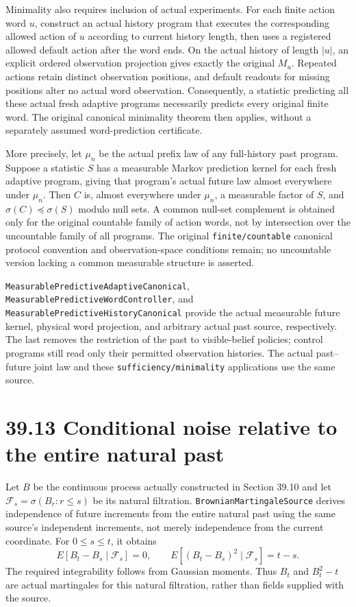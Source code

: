\documentclass[
  english,
  11pt,
  oneside]{book}
\begin{document}
Minimality also requires inclusion of actual experiments. For each finite action word \(u\), construct an actual history program that executes the corresponding allowed action of \(u\) according to current history length, then uses a registered allowed default action after the word ends. On the actual history of length \(|u|\), an explicit ordered observation projection gives exactly the original \(M_u\). Repeated actions retain distinct observation positions, and default readouts for missing positions alter no actual word observation. Consequently, a statistic predicting all these actual fresh adaptive programs necessarily predicts every original finite word. The original canonical minimality theorem then applies, without a separately assumed word-prediction certificate.

More precisely, let \(\mu_n\) be the actual prefix law of any full-history past program. Suppose a statistic \(S\) has a measurable Markov prediction kernel for each fresh adaptive program, giving that program's actual future law almost everywhere under \(\mu_n\). Then \(C\) is, almost everywhere under \(\mu_n\), a measurable factor of \(S\), and \(\sigma(C)\preceq\sigma(S)\) modulo null sets. A common null-set complement is obtained only for the original countable family of action words, not by intersection over the uncountable family of all programs. The original \nolinkurl{finite/countable} canonical protocol convention and observation-space conditions remain; no uncountable version lacking a common measurable structure is asserted.

\nolinkurl{MeasurablePredictiveAdaptiveCanonical}, \nolinkurl{MeasurablePredictiveWordController}, and \nolinkurl{MeasurablePredictiveHistoryCanonical} provide the actual measurable future kernel, physical word projection, and arbitrary actual past source, respectively. The last removes the restriction of the past to visible-belief policies; control programs still read only their permitted observation histories. The actual past--future joint law and these \nolinkurl{sufficiency/minimality} applications use the same source.

\section{39.13 Conditional noise relative to the entire natural past}\label{conditional-noise-relative-to-the-entire-natural-past}

Let \(B\) be the continuous process actually constructed in Section 39.10 and let \(\mathcal F_s=\sigma(B_r:r\le s)\) be its natural filtration. \nolinkurl{BrownianMartingaleSource} derives independence of future increments from the entire natural past using the same source's independent increments, not merely independence from the current coordinate. For \(0\le s\le t\), it obtains \[E[B_t-B_s\mid\mathcal F_s]=0,\qquad
E[(B_t-B_s)^2\mid\mathcal F_s]=t-s.\] The required integrability follows from Gaussian moments. Thus \(B_t\) and \(B_t^2-t\) are actual martingales for this natural filtration, rather than fields supplied with the source.
\end{document}
